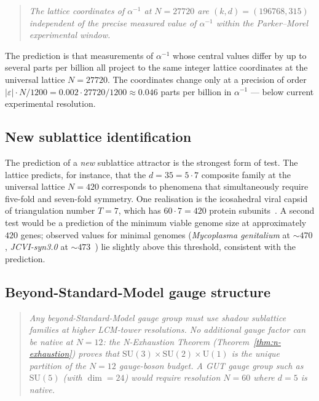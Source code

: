 \documentclass[11pt,a4paper]{article}
\theoremstyle{definition}
\theoremstyle{remark}
\newcommand{\eps}{\varepsilon}
\begin{document}
\begin{quote}\itshape
The lattice coordinates of $\alpha^{-1}$ at $N=27720$ are $(k,d)=(196768,315)$ independent of the precise measured value of $\alpha^{-1}$ within the Parker--Morel experimental window.
\end{quote}

The prediction is that measurements of $\alpha^{-1}$ whose central values differ by up to several parts per billion all project to the same integer lattice coordinates at the universal lattice $N=27720$. The coordinates change only at a precision of order $|\eps|\cdot N/1200 = 0.002\cdot 27720/1200 \approx 0.046$ parts per billion in $\alpha^{-1}$ --- below current experimental resolution.

\subsection{New sublattice identification}

The prediction of a \emph{new} sublattice attractor is the strongest form of test. The lattice predicts, for instance, that the $d=35 = 5\cdot 7$ composite family at the universal lattice $N=420$ corresponds to phenomena that simultaneously require five-fold and seven-fold symmetry. One realisation is the icosahedral viral capsid of triangulation number $T=7$, which has $60\cdot 7 = 420$ protein subunits~\cite{CasparKlug}. A second test would be a prediction of the minimum viable genome size at approximately $420$ genes; observed values for minimal genomes (\emph{Mycoplasma genitalium} at $\sim 470$, \emph{JCVI-syn3.0} at $\sim 473$~\cite{Hutchison2016}) lie slightly above this threshold, consistent with the prediction.

\subsection{Beyond-Standard-Model gauge structure}\label{subsec:bsm-prediction}

\begin{quote}\itshape
Any beyond-Standard-Model gauge group must use shadow sublattice families at higher LCM-tower resolutions. No additional gauge factor can be native at $N = 12$: the N-Exhaustion Theorem (Theorem~\ref{thm:n-exhaustion}) proves that $\mathrm{SU}(3)\times\mathrm{SU}(2)\times\mathrm{U}(1)$ is the unique partition of the $N = 12$ gauge-boson budget. A GUT gauge group such as $\mathrm{SU}(5)$ (with $\dim = 24$) would require resolution $N = 60$ where $d = 5$ is native.
\end{quote}
\end{document}
